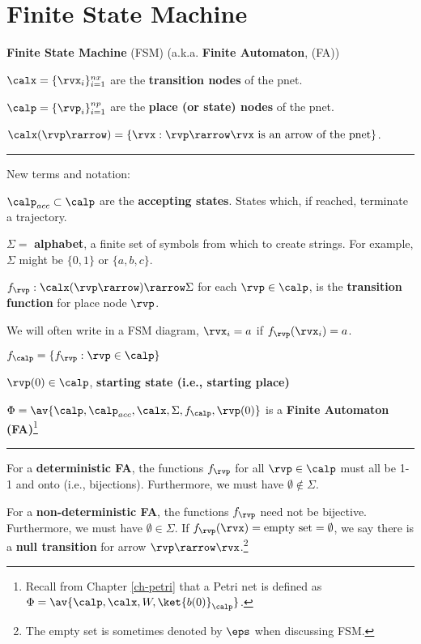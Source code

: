 \chapter{Finite State Machine}
\label{ch-finite-state}

{\bf Finite State Machine} (FSM) (a.k.a. {\bf Finite Automaton}, (FA))

$\calx =\{\rvx_i\}_{i=1}^{nx}$ are the {\bf transition nodes} of the pnet.

$\calp =\{\rvp_i\}_{i=1}^{np}$ are the {\bf place (or state) nodes} of the pnet.

$\calx(\rvp\rarrow)=\{\rvx: \rvp\rarrow\rvx \text{ is an arrow of the pnet}\}$.

\hrule
New terms and notation:

$\calp_{acc}\subset \calp$ are the 
{\bf accepting states}. States which, if reached, terminate a trajectory.



$\Sigma=$ {\bf alphabet}, a finite set of symbols
from which to create strings. For example,
$\Sigma$ might be $\{0, 1\}$ or $\{a, b, c\}$.


$f_\rvp:\calx(\rvp\rarrow)\rarrow \Sigma$ for each
$\rvp\in \calp$,  is the 
{\bf transition function} for place node $\rvp$. 
\begin{mdframed}[hidealllines=true,backgroundcolor=blue!10]We will often write in a 
FSM diagram, $\rvx_i=a$ if $f_{\rvp}(\rvx_i)=a$. \end{mdframed}



$f_\calp =
\{f_\rvp: \rvp\in \calp\}$





$\rvp(0)\in \calp$, {\bf starting state (i.e., starting place)}



$\Phi=\av{\calp,\calp_{acc}, \calx, \Sigma, f_\calp, \rvp(0) }$ is a {\bf Finite Automaton (FA)}\footnote{Recall from Chapter \ref{ch-petri} that a Petri net is defined as $\Phi = \av{\calp, \calx, W,\ket{b(0)}_\calp}$.
}

\hrule
For a {\bf deterministic FA}, the functions
$f_\rvp$ for all $\rvp\in \calp$
must all be 1-1 and onto (i.e., bijections).
Furthermore, we must have 
$\emptyset\not\in \Sigma$. 

For a {\bf non-deterministic FA},  the functions
$f_\rvp$ need not be bijective.
Furthermore, we must have 
$\emptyset\in \Sigma$. If $f_\rvp(\rvx)=\text{empty set}=\emptyset$, we say there is a  {\bf null transition} for arrow 
$\rvp\rarrow \rvx$.\footnote{The empty set is sometimes denoted by $\eps$ 
when discussing FSM.}